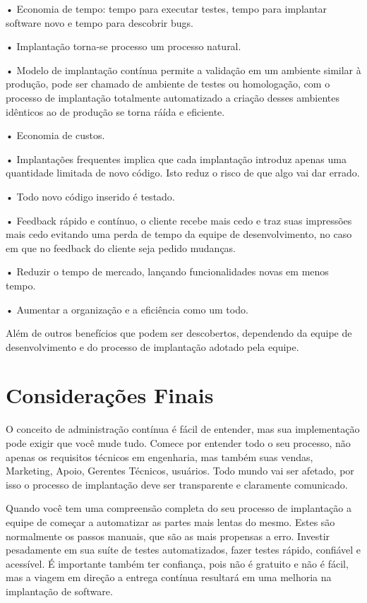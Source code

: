 \documentclass[12pt]{article}
\begin{document}
• Economia de tempo: tempo para executar testes, tempo para implantar software novo e tempo para descobrir bugs.

• Implantação torna-se processo um processo natural.

• Modelo de implantação contínua permite  a validação em um ambiente similar à produção, pode ser chamado de ambiente de testes ou homologação, com o processo de implantação totalmente automatizado a criação desses ambientes idênticos ao de produção se torna ráída e eficiente.

• Economia de custos.

• Implantações frequentes implica que cada implantação introduz apenas uma quantidade limitada de novo código. Isto reduz o risco de que algo vai dar errado.

• Todo novo código inserido é testado.

• Feedback rápido e contínuo, o cliente recebe mais cedo e traz suas impressões mais cedo evitando uma perda de tempo da equipe de desenvolvimento, no caso em que no feedback do cliente seja pedido mudanças. 

• Reduzir o tempo de mercado, lançando funcionalidades novas em menos tempo.

• Aumentar a organização e a eficiência como um todo.


Além de outros benefícios que podem ser descobertos, dependendo da equipe de desenvolvimento e do processo de implantação adotado pela equipe.

\section{Considerações Finais} \label{sec6}

O conceito de administração contínua é fácil de entender, mas sua implementação pode exigir que você mude tudo. Comece por entender todo o seu processo, não apenas os requisitos técnicos em engenharia, mas também suas vendas, Marketing, Apoio, Gerentes Técnicos, usuários. Todo mundo vai ser afetado, por isso o processo de implantação deve ser transparente e claramente comunicado.

Quando você tem uma compreensão completa do seu processo de implantação a equipe de começar a automatizar as partes mais lentas do mesmo. Estes são normalmente os passos manuais, que são as mais propensas a erro. Investir pesadamente em sua suíte de testes automatizados, fazer testes rápido, confiável e acessível. É importante também ter confiança, pois não é gratuito e não é fácil, mas a viagem em direção a entrega contínua resultará em uma melhoria na implantação de software.
\end{document}
